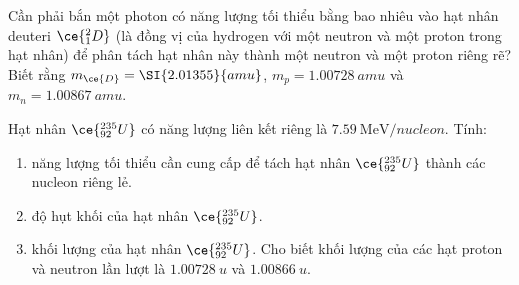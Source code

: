 \begin{ex}
	Cần phải bắn một photon có năng lượng tối thiểu bằng bao nhiêu vào hạt nhân deuteri $\ce{_1^2D}$ (là đồng vị của hydrogen với một neutron và một proton trong hạt nhân) để phân tách hạt nhân này thành một neutron và một proton riêng rẽ? Biết rằng $m_{\ce{D}}=\SI{2.01355}{amu}$, $m_{p}=\SI{1.00728 }{amu}$ và $m_{n}=\SI{1.00867}{amu}$.	
\end{ex}
\begin{ex}
	Hạt nhân $\ce{_{92}^{235}U}$ có năng lượng liên kết riêng là $\SI{7.59}{\mega\electronvolt/nucleon}$. Tính:
	\begin{enumerate}[label=\alph*)]
		\item năng lượng tối thiểu cần cung cấp để tách hạt nhân $\ce{_{92}^{235}U}$ thành các nucleon riêng lẻ.
		\item độ hụt khối của hạt nhân $\ce{_{92}^{235}U}$.
		\item khối lượng của hạt nhân $\ce{_{92}^{235}U}$. Cho biết khối lượng của các hạt proton và neutron lần lượt là $\SI{1.00728}{u}$ và $\SI{1.00866}{u}$.
	\end{enumerate}
\end{ex}
